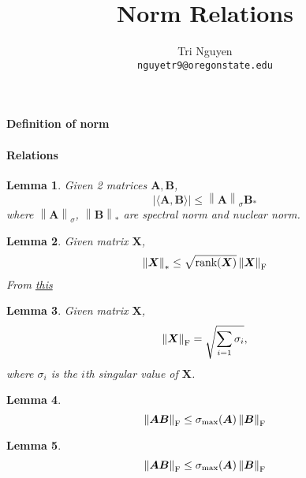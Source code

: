 \documentclass[11pt,a4paper]{article}
\title{Norm Relations}
\author{	Tri Nguyen \\
        \texttt{nguyetr9@oregonstate.edu} \\
        }
\newcommand{\norm}[1]{\left\lVert#1\right\rVert}
\newcommand{\abs}[1]{\left\lvert#1\right\rvert}
\theoremstyle{plain}
\newtheorem{lemma}{Lemma}[section]
\theoremstyle{definition}
\theoremstyle{remark}
\begin{document}
\maketitle

\paragraph{Definition of norm} 

\paragraph{Relations} 
\begin{lemma}
    Given 2 matrices $\bm{A}, \bm{B}$,
    \[
    \abs{ \langle \bm{A}, \bm{B} \rangle} \leq \norm{\bm{A}}_{\sigma} \bm{B}_{*}
    \] 
    where $\norm{\bm{A}}_\sigma$, $\norm{\bm{B}}_{*}$ are spectral norm and nuclear norm.
\end{lemma}
\begin{lemma}
    Given matrix $\bm{X}$,
    \[
    \norm{\bm{X}}_{*} \leq \sqrt{\text{rank}(\bm{X})} \norm{\bm{X}}_{\rm F}
    \] 
    From \href{https://math.stackexchange.com/questions/2397442/inequality-between-frobenius-and-nuclear-norm?rq=1}{this}
\end{lemma}
\begin{lemma}
    Given matrix $\bm{X}$,
    \[
    \norm{\bm{X}}_{\rm F} = \sqrt{\sum_{i=1} \sigma_i },
    \] 
    where $\sigma_i$ is the $i$th singular value of $\bm{X}$.
\end{lemma}
\begin{lemma}
    \[
    \norm{\bm{A} \bm{B}}_{\rm F} \leq \sigma_{\max}(\bm{A}) \norm{\bm{B}}_{\rm F}
    \] 
\end{lemma}
\begin{lemma}
    \[
    \norm{\bm{A} \bm{B}}_{\rm F} \leq \sigma_{\max}(\bm{A}) \norm{\bm{B}}_{\rm F}
    \] 
\end{lemma}
\end{document}
